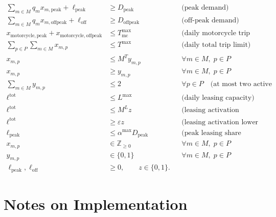 \begin{align}
\sum_{m \in M} q_m x_{m,\mathrm{peak}} + \ell_{\mathrm{peak}} &\ge D_{\mathrm{peak}}
&& \text{(peak demand)} \\
\sum_{m \in M} q_m x_{m,\mathrm{offpeak}} + \ell_{\mathrm{off}} &\ge D_{\mathrm{offpeak}}
&& \text{(off-peak demand)} \\
x_{\mathrm{motorcycle},\mathrm{peak}} + x_{\mathrm{motorcycle},\mathrm{offpeak}} &\le T^{\max}_{\mathrm{mc}}
&& \text{(daily motorcycle trip limit)} \\
\sum_{p \in P}\sum_{m \in M} x_{m,p} &\le T^{\max}
&& \text{(daily total trip limit)} \\
x_{m,p} &\le M^{T} y_{m,p}
&& \forall m \in M,\; p \in P \\
x_{m,p} &\ge y_{m,p}
&& \forall m \in M,\; p \in P \\
\sum_{m \in M} y_{m,p} &\le 2
&& \forall p \in P \quad \text{(at most two active methods per period)} \\
\ell^{\mathrm{tot}} &\le L^{\max}
&& \text{(daily leasing capacity)} \\
\ell^{\mathrm{tot}} &\le M^{L} z
&& \text{(leasing activation upper link)} \\
\ell^{\mathrm{tot}} &\ge \varepsilon z
&& \text{(leasing activation lower link)} \\
\ell_{\mathrm{peak}} &\le \alpha^{\max} D_{\mathrm{peak}}
&& \text{(peak leasing share limit)} \\
x_{m,p} &\in \mathbb{Z}_{\ge 0}
&& \forall m \in M,\; p \in P \\
y_{m,p} &\in \{0,1\}
&& \forall m \in M,\; p \in P \\
\ell_{\mathrm{peak}},\ell_{\mathrm{off}} &\ge 0,\qquad z \in \{0,1\}. &&
\end{align}

\section*{Notes on Implementation}

